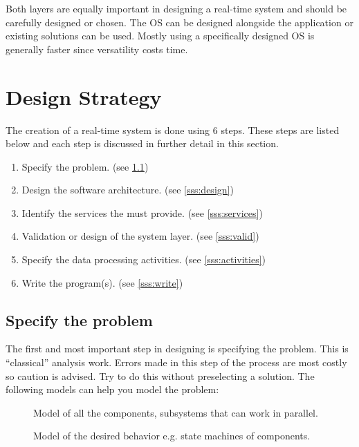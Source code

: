 Both layers are equally important in designing a real-time system and should be carefully designed or chosen.
The OS can be designed alongside the application or existing solutions can be used. 
Mostly using a specifically designed OS is generally faster since versatility costs time.

\section{Design Strategy}
The creation of a real-time system is done using 6 steps.
These steps are listed below and each step is discussed in further detail in this section. 
\begin{enumerate}
	\item Specify the problem. (see \ref{sss:specify_problem})
	\item Design the software architecture. (see \ref{sss:design})
	\item Identify the services the  must provide. (see \ref{sss:services})
	\item Validation or design of the system layer. (see \ref{sss:valid})
	\item Specify the data processing activities. (see \ref{sss:activities})
	\item Write the program(s). (see \ref{sss:write})
\end{enumerate}

\subsection{Specify the problem}
\label{sss:specify_problem}
The first and most important step in designing is specifying the problem. This is ``classical'' analysis work.
Errors made in this step of the process are most costly so caution is advised. 
Try to do this without preselecting a solution. The following models can help you model the problem:
\begin{description}
	\item[] Model of all the components, subsystems that can work in parallel.
	\item[] Model of the desired behavior e.g. state machines of components. 
\end{description}


